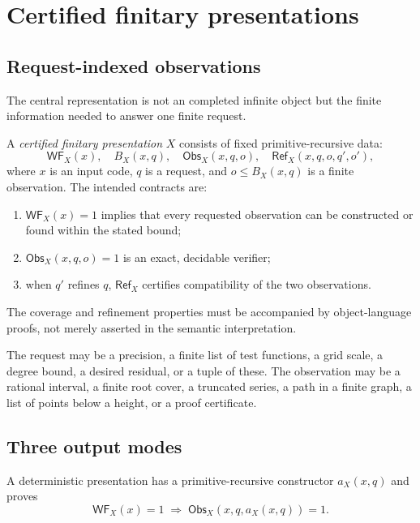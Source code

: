 \section{Certified finitary presentations}

\subsection{Request-indexed observations}

The central representation is not an completed infinite object but the finite
information needed to answer one finite request.

\begin{definition}
A \emph{certified finitary presentation} \(X\) consists of fixed
primitive-recursive data:
\[
  \mathsf{WF}_X(x),\quad
  B_X(x,q),\quad
  \mathsf{Obs}_X(x,q,o),\quad
  \mathsf{Ref}_X(x,q,o,q',o'),
\]
where \(x\) is an input code, \(q\) is a request, and \(o\le B_X(x,q)\) is a
finite observation.  The intended contracts are:
\begin{enumerate}[label=(\roman*)]
\item \(\mathsf{WF}_X(x)=1\) implies that every requested observation can be
      constructed or found within the stated bound;
\item \(\mathsf{Obs}_X(x,q,o)=1\) is an exact, decidable verifier;
\item when \(q'\) refines \(q\), \(\mathsf{Ref}_X\) certifies compatibility of
      the two observations.
\end{enumerate}
The coverage and refinement properties must be accompanied by object-language
proofs, not merely asserted in the semantic interpretation.
\end{definition}

The request may be a precision, a finite list of test functions, a grid scale,
a degree bound, a desired residual, or a tuple of these.  The observation may
be a rational interval, a finite root cover, a truncated series, a path in a
finite graph, a list of points below a height, or a proof certificate.

\subsection{Three output modes}

\begin{definition}
A deterministic presentation has a primitive-recursive constructor
\(a_X(x,q)\) and proves
\[
  \mathsf{WF}_X(x)=1
  \;\Longrightarrow\;
  \mathsf{Obs}_X(x,q,a_X(x,q))=1.
\]
\end{definition}

